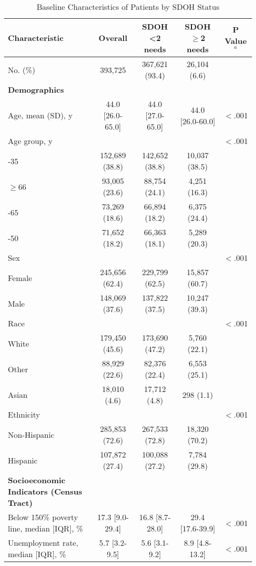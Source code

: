 \begin{table}[htbp]
\centering
\caption{Baseline Characteristics of Patients by SDOH Status}
\label{tab:table1}
\begin{tabular}{lcccc}
\toprule
Characteristic & Overall & SDOH <2 needs & SDOH $\geq$2 needs & P Value$^a$ \\
\midrule
No. (\%) & 393,725 & 367,621 (93.4) & 26,104 (6.6) &  \\
\textbf{Demographics} &  &  &  &  \\
\addlinespace
\quad Age, mean (SD), y & 44.0 [26.0-65.0] & 44.0 [27.0-65.0] & 44.0 [26.0-60.0] & $<$.001 \\
\quad Age group, y &  &  &  & $<$.001 \\
\quad \quad   18-35 & 152,689 (38.8) & 142,652 (38.8) & 10,037 (38.5) &  \\
\quad \quad   $\geq$66 & 93,005 (23.6) & 88,754 (24.1) & 4,251 (16.3) &  \\
\quad \quad   51-65 & 73,269 (18.6) & 66,894 (18.2) & 6,375 (24.4) &  \\
\quad \quad   36-50 & 71,652 (18.2) & 66,363 (18.1) & 5,289 (20.3) &  \\
\quad Sex &  &  &  & $<$.001 \\
\quad \quad   Female & 245,656 (62.4) & 229,799 (62.5) & 15,857 (60.7) &  \\
\quad \quad   Male & 148,069 (37.6) & 137,822 (37.5) & 10,247 (39.3) &  \\
\quad Race &  &  &  & $<$.001 \\
\quad \quad   White & 179,450 (45.6) & 173,690 (47.2) & 5,760 (22.1) &  \\
\quad \quad   Other & 88,929 (22.6) & 82,376 (22.4) & 6,553 (25.1) &  \\
\quad \quad   Asian & 18,010 (4.6) & 17,712 (4.8) & 298 (1.1) &  \\
\quad Ethnicity &  &  &  & $<$.001 \\
\quad \quad   Non-Hispanic & 285,853 (72.6) & 267,533 (72.8) & 18,320 (70.2) &  \\
\quad \quad   Hispanic & 107,872 (27.4) & 100,088 (27.2) & 7,784 (29.8) &  \\
\textbf{Socioeconomic Indicators (Census Tract)} &  &  &  &  \\
\addlinespace
\quad Below 150\% poverty line, median [IQR], \% & 17.3 [9.0-29.4] & 16.8 [8.7-28.0] & 29.4 [17.6-39.9] & $<$.001 \\
\quad Unemployment rate, median [IQR], \% & 5.7 [3.2-9.5] & 5.6 [3.1-9.2] & 8.9 [4.8-13.2] & $<$.001 \\

\end{tabular}
\end{table}
